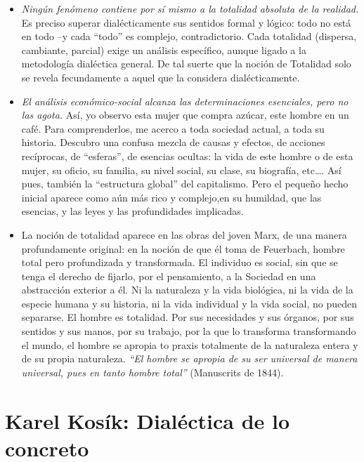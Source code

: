 \documentclass[
  letterpaper,
  DIV=11,
  numbers=noendperiod]{scrreprt}
\begin{document}
\begin{itemize}
\item
  \emph{Ningún fenómeno contiene por sí mismo a la totalidad absoluta de
  la realidad.} Es preciso superar dialécticamente sus sentidos formal y
  lógico: todo no está en todo --y cada ``todo'' es complejo,
  contradictorio. Cada totalidad (dispersa, cambiante, parcial) exige un
  análisis específico, aunque ligado a la metodología dialéctica
  general. De tal suerte que la noción de Totalidad solo se revela
  fecundamente a aquel que la considera dialécticamente.
\item
  \emph{El análisis económico-social alcanza las determinaciones
  esenciales, pero no las agota.} Así, yo observo esta mujer que compra
  azúcar, este hombre en un café. Para comprenderlos, me acerco a toda
  sociedad actual, a toda su historia. Descubro una confusa mezcla de
  causas y efectos, de acciones recíprocas, de ``esferas'', de esencias
  ocultas: la vida de este hombre o de esta mujer, su oficio, su
  familia, su nivel social, su clase, su biografía, etc\ldots. Así pues,
  también la ``estructura global'' del capitalismo. Pero el pequeño
  hecho inicial aparece como aún más rico y complejo,en su humildad, que
  las esencias, y las leyes y las profundidades implicadas.
\item
  La noción de totalidad aparece en las obras del joven Marx, de una
  manera profundamente original: en la noción de que él toma de
  Feuerbach, hombre total pero profundizada y transformada. El individuo
  es social, sin que se tenga el derecho de fijarlo, por el pensamiento,
  a la Sociedad en una abstracción exterior a él. Ni la naturaleza y la
  vida biológica, ni la vida de la especie humana y su historia, ni la
  vida individual y la vida social, no pueden separarse. El hombre es
  totalidad. Por sus necesidades y sus órganos, por sus sentidos y sus
  manos, por su trabajo, por la que lo transforma transformando el
  mundo, el hombre se apropia to praxis totalmente de la naturaleza
  entera y de su propia naturaleza. \emph{``El hombre se apropia de su
  ser universal de manera universal, pues en tanto hombre total''}
  (Manuscrits de 1844).
\end{itemize}

\chapter{Karel Kosík: Dialéctica de lo
concreto}\label{karel-kosuxedk-dialuxe9ctica-de-lo-concreto}
\end{document}

